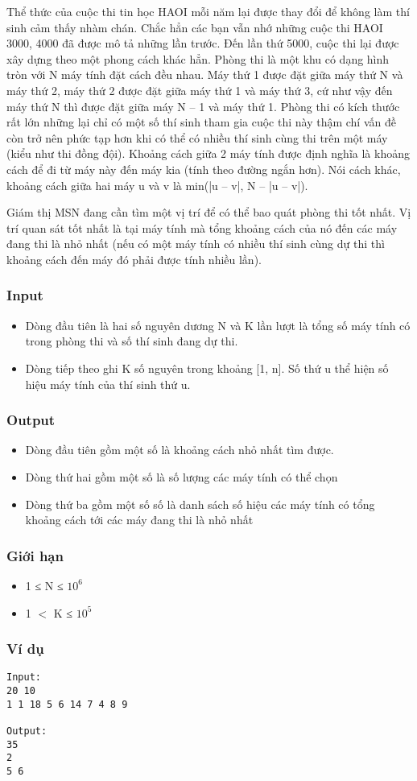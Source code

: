 



   Thể thức của cuộc thi tin học HAOI mỗi năm lại được thay đổi để không làm thí sinh cảm thấy nhàm chán. Chắc hẳn các bạn vẫn nhớ những cuộc thi HAOI 3000, 4000 đã được mô tả những lần trước. Đến lần thứ 5000, cuộc thi lại được xây dựng theo một phong cách khác hẳn. Phòng thi là một khu có dạng hình tròn với N máy tính đặt cách đều nhau. Máy thứ 1 được đặt giữa máy thứ N và máy thứ 2, máy thứ 2 được đặt giữa máy thứ 1 và máy thứ 3, cứ như vậy đến máy thứ N thì được đặt giữa máy N – 1 và máy thứ 1. Phòng thi có kích thước rất lớn những lại chỉ có một số thí sinh tham gia cuộc thi này thậm chí vấn đề còn trở nên phức tạp hơn khi có thể có nhiều thí sinh cùng thi trên một máy (kiểu như thi đồng đội). Khoảng cách giữa 2 máy tính được định nghĩa là khoảng cách để đi từ máy này đến máy kia (tính theo đường ngắn hơn). Nói cách khác, khoảng cách giữa hai máy u và v là min(|u – v|, N – |u – v|).  

   Giám thị MSN đang cần tìm một vị trí để có thể bao quát phòng thi tốt nhất. Vị trí quan sát tốt nhất là tại máy tính mà tổng khoảng cách của nó đến các máy đang thi là nhỏ nhất (nếu có một máy tính có nhiều thí sinh cùng dự thi thì khoảng cách đến máy đó phải được tính nhiều lần).  

\subsubsection{   Input  }
\begin{itemize}
	\item     Dòng đầu tiên là hai số nguyên dương N và K lần lượt là tổng số máy tính có trong phòng thi và số thí sinh đang dự thi.   
	\item     Dòng tiếp theo ghi K số nguyên trong khoảng [1, n]. Số thứ u thể hiện số hiệu máy tính của thí sinh thứ u.   
\end{itemize}

\subsubsection{   Output  }
\begin{itemize}
	\item     Dòng đầu tiên gồm một số là khoảng cách nhỏ nhất tìm được.   
	\item     Dòng thứ hai gồm một số là số lượng các máy tính có thể chọn   
	\item     Dòng thứ ba gồm một số số là danh sách số hiệu các máy tính có tổng khoảng cách tới các máy đang thi là nhỏ nhất   
\end{itemize}

\subsubsection{   Giới hạn  }
\begin{itemize}
	\item     1 ≤ N ≤ $10^{6}$
	\item     1 $<$ K ≤ $10^{5}$
\end{itemize}

\subsubsection{   Ví dụ  }
\begin{verbatim}
Input:
20 10
1 1 18 5 6 14 7 4 8 9

Output:
35
2
5 6
\end{verbatim}
